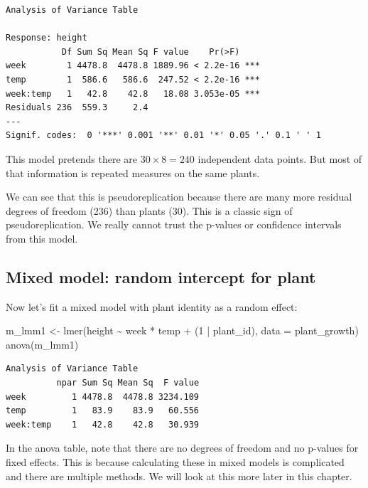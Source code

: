 \documentclass[
  letterpaper,
  8pt,
  a4paper]{book}
\newenvironment{Shaded}{\begin{snugshade}}{\end{snugshade}}
\newcommand{\AttributeTok}[1]{\textcolor[rgb]{0.40,0.45,0.13}{#1}}
\newcommand{\DecValTok}[1]{\textcolor[rgb]{0.68,0.00,0.00}{#1}}
\newcommand{\FunctionTok}[1]{\textcolor[rgb]{0.28,0.35,0.67}{#1}}
\newcommand{\NormalTok}[1]{\textcolor[rgb]{0.00,0.23,0.31}{#1}}
\newcommand{\OtherTok}[1]{\textcolor[rgb]{0.00,0.23,0.31}{#1}}
\newcommand{\SpecialCharTok}[1]{\textcolor[rgb]{0.37,0.37,0.37}{#1}}
\begin{document}
\begin{verbatim}
Analysis of Variance Table

Response: height
           Df Sum Sq Mean Sq F value    Pr(>F)    
week        1 4478.8  4478.8 1889.96 < 2.2e-16 ***
temp        1  586.6   586.6  247.52 < 2.2e-16 ***
week:temp   1   42.8    42.8   18.08 3.053e-05 ***
Residuals 236  559.3     2.4                      
---
Signif. codes:  0 '***' 0.001 '**' 0.01 '*' 0.05 '.' 0.1 ' ' 1
\end{verbatim}

This model pretends there are \(30 \times 8 = 240\) independent data
points. But most of that information is repeated measures on the same
plants.

We can see that this is pseudoreplication because there are many more
residual degrees of freedom (236) than plants (30). This is a classic
sign of pseudoreplication. We really cannot trust the p-values or
confidence intervals from this model.

\subsection*{Mixed model: random intercept for
plant}\label{mixed-model-random-intercept-for-plant}

Now let's fit a mixed model with plant identity as a random effect:

\begin{Shaded}
\begin{Highlighting}[]
\NormalTok{m\_lmm1 }\OtherTok{\textless{}{-}} \FunctionTok{lmer}\NormalTok{(height }\SpecialCharTok{\textasciitilde{}}\NormalTok{ week }\SpecialCharTok{*}\NormalTok{ temp }\SpecialCharTok{+}\NormalTok{ (}\DecValTok{1} \SpecialCharTok{|}\NormalTok{ plant\_id), }\AttributeTok{data =}\NormalTok{ plant\_growth)}
\FunctionTok{anova}\NormalTok{(m\_lmm1)}
\end{Highlighting}
\end{Shaded}

\begin{verbatim}
Analysis of Variance Table
          npar Sum Sq Mean Sq  F value
week         1 4478.8  4478.8 3234.109
temp         1   83.9    83.9   60.556
week:temp    1   42.8    42.8   30.939
\end{verbatim}

In the anova table, note that there are no degrees of freedom and no
p-values for fixed effects. This is because calculating these in mixed
models is complicated and there are multiple methods. We will look at
this more later in this chapter.
\end{document}
